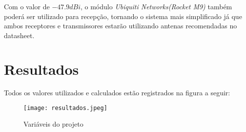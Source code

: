 Com o valor de $-47.9dBi$, o módulo \textit{Ubiquiti Networks(Rocket M9)} também poderá ser utilizado para recepção, tornando o sistema mais simplificado já que ambos receptores e transmissores estarão utilizando antenas recomendadas no datasheet.

\chapter{Resultados}
Todos os valores utilizados e calculados estão registrados na figura a seguir:
\begin{figure}[h]
	\centering
	\texttt{[image: resultados.jpeg]}
	\label{fig:result}
	\caption{Variáveis do projeto}
\end{figure} 


